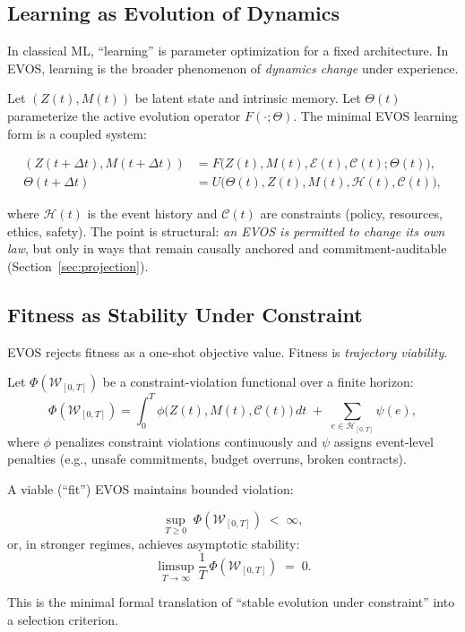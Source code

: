 \documentclass[11pt]{article}
\begin{document}
\subsection{Learning as Evolution of Dynamics}
\label{sec:learning-as-dynamics}

In classical ML, ``learning'' is parameter optimization for a fixed architecture. In EVOS,
learning is the broader phenomenon of \emph{dynamics change} under experience.

Let $(Z(t),M(t))$ be latent state and intrinsic memory. Let $\Theta(t)$ parameterize the active
evolution operator $F(\cdot;\Theta)$. The minimal EVOS learning form is a coupled system:

\begin{align}
(Z(t+\Delta t),M(t+\Delta t)) &= F\big(Z(t),M(t),\mathcal{E}(t),\mathcal{C}(t);\Theta(t)\big), \\
\Theta(t+\Delta t) &= U\big(\Theta(t), Z(t),M(t),\mathcal{H}(t),\mathcal{C}(t)\big),
\end{align}

where $\mathcal{H}(t)$ is the event history and $\mathcal{C}(t)$ are constraints (policy, resources,
ethics, safety). The point is structural: \emph{an EVOS is permitted to change its own law}, but only
in ways that remain causally anchored and commitment-auditable (Section~\ref{sec:projection}).

\subsection{Fitness as Stability Under Constraint}
\label{sec:fitness}

EVOS rejects fitness as a one-shot objective value. Fitness is \emph{trajectory viability}.

Let $\Phi(\mathcal{W}_{[0,T]})$ be a constraint-violation functional over a finite horizon:
\[
\Phi(\mathcal{W}_{[0,T]})
= \int_0^T \phi\big(Z(t),M(t),\mathcal{C}(t)\big)\,dt
\;+\; \sum_{e\in\mathcal{H}_{[0,T]}} \psi(e),
\]
where $\phi$ penalizes constraint violations continuously and $\psi$ assigns event-level penalties
(e.g., unsafe commitments, budget overruns, broken contracts).

A viable (``fit'') EVOS maintains bounded violation:

\[
\sup_{T\ge 0}\; \Phi(\mathcal{W}_{[0,T]}) \;<\; \infty,
\]
or, in stronger regimes, achieves asymptotic stability:
\[
\limsup_{T\rightarrow\infty} \frac{1}{T}\,\Phi(\mathcal{W}_{[0,T]}) \;=\; 0.
\]

This is the minimal formal translation of ``stable evolution under constraint'' into a selection
criterion.
\end{document}
